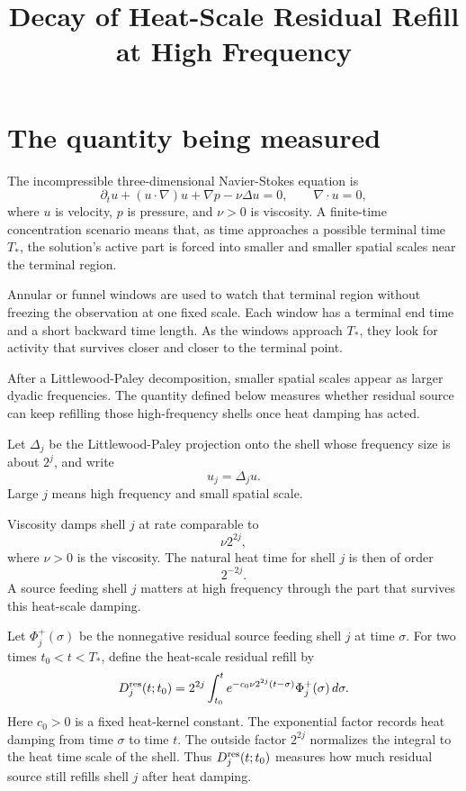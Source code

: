 \documentclass[11pt]{article}
\title{Decay of Heat-Scale Residual Refill at High Frequency}
\author{}
\date{}
\newcommand{\dd}{\,d}
\theoremstyle{definition}
\begin{document}
\maketitle

\section*{The quantity being measured}

The incompressible three-dimensional Navier-Stokes equation is
\[
\partial_t u+(u\cdot\nabla)u+\nabla p-\nu\Delta u=0,
\qquad
\nabla\cdot u=0,
\]
where \(u\) is velocity, \(p\) is pressure, and \(\nu>0\) is viscosity. A
finite-time concentration scenario means that, as time approaches a possible
terminal time \(T_*\), the solution's active part is forced into smaller and
smaller spatial scales near the terminal region.

Annular or funnel windows are used to watch that terminal region without
freezing the observation at one fixed scale. Each window has a terminal end
time and a short backward time length. As the windows approach \(T_*\), they
look for activity that survives closer and closer to the terminal point.

After a Littlewood-Paley decomposition, smaller spatial scales appear as larger
dyadic frequencies. The quantity defined below measures whether residual source
can keep refilling those high-frequency shells once heat damping has acted.

Let \(\Delta_j\) be the Littlewood-Paley projection onto the shell whose
frequency size is about \(2^j\), and write
\[
u_j=\Delta_j u.
\]
Large \(j\) means high frequency and small spatial scale.

Viscosity damps shell \(j\) at rate comparable to
\[
\nu2^{2j},
\]
where \(\nu>0\) is the viscosity. The natural heat time for shell \(j\) is
then of order
\[
2^{-2j}.
\]
A source feeding shell \(j\) matters at high frequency through the part
that survives this heat-scale damping.

Let \(\Phi_j^+(\sigma)\) be the nonnegative residual source feeding shell \(j\)
at time \(\sigma\). For two times \(t_0<t<T_*\), define the heat-scale residual
refill by
\[
D_j^{\rm res}(t;t_0)
=
2^{2j}\int_{t_0}^{t}
e^{-c_0\nu2^{2j}(t-\sigma)}
\Phi_j^+(\sigma)\dd\sigma .
\]
Here \(c_0>0\) is a fixed heat-kernel constant. The exponential factor records
heat damping from time \(\sigma\) to time \(t\). The outside factor \(2^{2j}\)
normalizes the integral to the heat time scale of the shell. Thus
\(D_j^{\rm res}(t;t_0)\) measures how much residual source still refills shell
\(j\) after heat damping.
\end{document}
